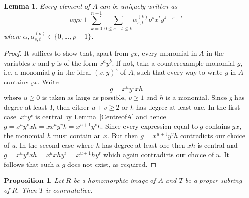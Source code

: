 \documentclass[11pt]{article}
\newtheorem{lemma}[corollary]{Lemma}
\newtheorem{proposition}[corollary]{Proposition}
\theoremstyle{definition}
\begin{document}
\begin{lemma}\label{ATwistedPolynomial}
Every element of $A$ can be uniquely written as
\[\alpha yx +\sum_{k=0}^{n-1}\sum_{0\leq s+t\leq k}\alpha_{s,t}^{(k)}p^sx^ty^{k-s-t}\]
where $\alpha,\alpha_{s,t}^{(k)}\in\lbrace 0,\ldots,p-1\rbrace$.
\end{lemma}

\begin{proof}
It suffices to show that, apart from $yx$, every monomial in $A$ in the variables $x$ and $y$ is of the form $x^ay^b$. If not, take a counterexample monomial $g$, i.e. a monomial $g$ in the ideal $(x,y)^3$ of $A$, such that every way to write $g$ in $A$ contains $yx$. Write
\[g=x^uy^vxh\]
where $u\geq 0$ is taken as large as possible, $v\geq 1$ and $h$ is a monomial. Since $g$ has degree at least 3, then either $u+v\geq 2$ or $h$ has degree at least one. In the first case, $x^uy^v$ is central by Lemma~\ref{CentreofA} and hence $g=x^uy^vxh=xx^uy^vh=x^{u+1}y^vh$. Since every expression equal to $g$ contains $yx$, the monomial $h$ must contain an $x$. But then $g=x^{u+1}y^vh$ contradicts our choice of $u$. In the second case where $h$ has degree at least one then $xh$ is central and $g=x^uy^vxh=x^uxhy^v=x^{u+1}hy^v$ which again contradicts our choice of $u$. It follows that such a $g$ does not exist, as required.
\end{proof}




















\begin{proposition}\label{SubringsInA_pCommutative}
Let $R$ be a homomorphic image of $A$ and $T$ be a proper subring of $R$. Then $T$ is commutative.
\end{proposition}
\end{document}

